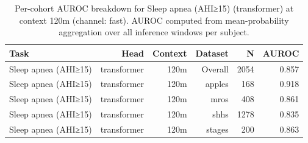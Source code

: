 \begin{table}[ht]
\centering
\caption{Per-cohort AUROC breakdown for Sleep apnea (AHI≥15) (transformer) at context 120m (channel: fast). AUROC computed from mean-probability aggregation over all inference windows per subject.}
\label{tab:cohort_apnea_binary_transformer_fast}
\begin{tabular}{lrrrrr}
\toprule
Task & Head & Context & Dataset & N & AUROC \\
\midrule
Sleep apnea (AHI≥15) & transformer & 120m & Overall & 2054 & 0.857 \\
Sleep apnea (AHI≥15) & transformer & 120m & apples & 168 & 0.918 \\
Sleep apnea (AHI≥15) & transformer & 120m & mros & 408 & 0.861 \\
Sleep apnea (AHI≥15) & transformer & 120m & shhs & 1278 & 0.835 \\
Sleep apnea (AHI≥15) & transformer & 120m & stages & 200 & 0.863 \\
\bottomrule
\end{tabular}
\end{table}